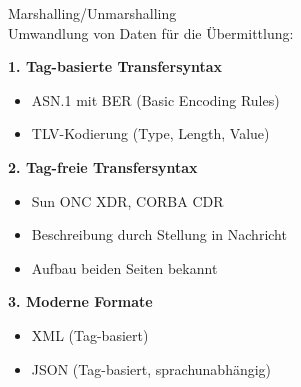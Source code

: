 \begin{concept}{Marshalling/Unmarshalling}\\
Umwandlung von Daten für die Übermittlung:

\textbf{1. Tag-basierte Transfersyntax}
\begin{itemize}
    \item ASN.1 mit BER (Basic Encoding Rules)
    \item TLV-Kodierung (Type, Length, Value)
\end{itemize}

\textbf{2. Tag-freie Transfersyntax}
\begin{itemize}
    \item Sun ONC XDR, CORBA CDR
    \item Beschreibung durch Stellung in Nachricht
    \item Aufbau beiden Seiten bekannt
\end{itemize}

\textbf{3. Moderne Formate}
\begin{itemize}
    \item XML (Tag-basiert)
    \item JSON (Tag-basiert, sprachunabhängig)
\end{itemize}
\end{concept}








